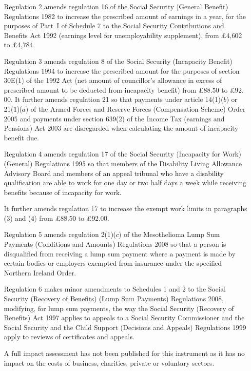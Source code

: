 \documentclass[12pt,a4paper]{article}
\begin{document}
Regulation 2 amends regulation 16 of the Social Security (General Benefit) Regulations 1982 to increase the prescribed amount of earnings in a year, for the purposes of Part~I of Schedule 7 to the Social Security Contributions and Benefits Act 1992 (earnings level for unemployability supplement), from £4,602 to £4,784.

Regulation 3 amends regulation 8 of the Social Security (Incapacity Benefit) Regulations 1994 to increase the prescribed amount for the purposes of section 30E(1) of the 1992 Act (net amount of councillor’s allowance in excess of prescribed amount to be deducted from incapacity benefit) from £88$.$50 to £92$.$00. It further amends regulation 21 so that payments under article 14(1)($b$)  or 21(1)($a$)  of the Armed Forces and Reserve Forces (Compensation Scheme) Order 2005 and payments under section 639(2) of the Income Tax (earnings and Pensions) Act 2003 are disregarded when calculating the amount of incapacity benefit due.

Regulation 4 amends regulation 17 of the Social Security (Incapacity for Work) (General) Regulations 1995 so that members of the Disability Living Allowance Advisory Board and members of an appeal tribunal who have a disability qualification are able to work for one day or two half days a week while receiving benefits because of incapacity for work.

It further amends regulation 17 to increase the exempt work limits in paragraphs (3) and (4) from £88$.$50 to £92$.$00.

Regulation 5 amends regulation 2(1)($c$)  of the Mesothelioma Lump Sum Payments (Conditions and Amounts) Regulations 2008 so that a person is disqualified from receiving a lump sum payment where a payment is made by certain bodies or employers exempted from insurance under the specified Northern Ireland Order.

Regulation 6 makes minor amendments to Schedules 1 and 2 to the Social Security (Recovery of Benefits) (Lump Sum Payments) Regulations 2008, modifying, for lump sum payments, the way the Social Security (Recovery of Benefits) Act 1997 applies to appeals to a Social Security Commissioner and the Social Security and the Child Support (Decisions and Appeals) Regulations 1999 apply to reviews of certificates and appeals.

A full impact assessment has not been published for this instrument as it has no impact on the costs of business, charities, private or voluntary sectors. 
\end{document}

